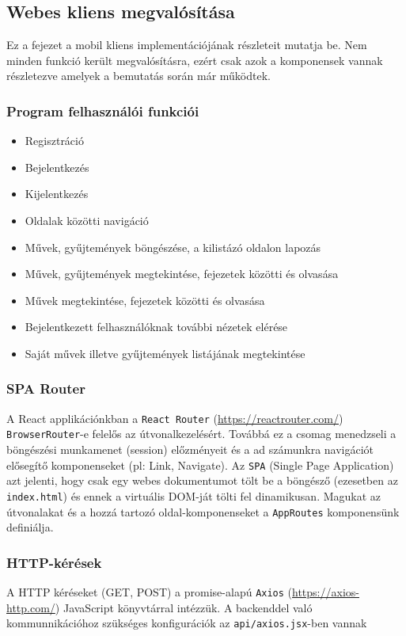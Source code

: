 \subsection{Webes kliens megvalósítása}
Ez a fejezet a mobil kliens implementációjának részleteit mutatja be.
Nem minden funkció került megvalósításra, ezért csak azok a komponensek vannak részletezve amelyek a bemutatás során már működtek.

\subsubsection{Program felhasználói funkciói}
\begin{itemize}
    \item Regisztráció
    \item Bejelentkezés
    \item Kijelentkezés
    \item Oldalak közötti navigáció
    \item Művek, gyűjtemények böngészése, a kilistázó oldalon lapozás
    \item Művek, gyűjtemények megtekintése, fejezetek közötti és olvasása
    \item Művek megtekintése, fejezetek közötti és olvasása
    \item Bejelentkezett felhasználóknak további nézetek elérése
    \item Saját művek illetve gyűjtemények listájának megtekintése
\end{itemize}

\subsubsection{SPA Router}
A React applikációnkban a \texttt{React Router} (\url{https://reactrouter.com/}) \texttt{BrowserRouter}-e felelős az útvonalkezelésért.
Továbbá ez a csomag menedzseli a böngészési munkamenet (session) előzményeit és a ad számunkra navigációt elősegítő komponenseket (pl: Link, Navigate).
Az \texttt{SPA} (Single Page Application) azt jelenti, hogy csak egy webes dokumentumot tölt be a böngésző (ezesetben az \texttt{index.html}) és ennek a virtuális DOM-ját tölti fel dinamikusan.
Magukat az útvonalakat és a hozzá tartozó oldal-komponenseket a \texttt{AppRoutes} komponensünk definiálja.

\subsubsection{HTTP-kérések}
A HTTP kéréseket (GET, POST) a promise-alapú \texttt{Axios} (\url{https://axios-http.com/}) JavaScript könyvtárral intézzük.
A backenddel való kommunnikációhoz szükséges konfigurációk az \texttt{api/axios.jsx}-ben vannak

